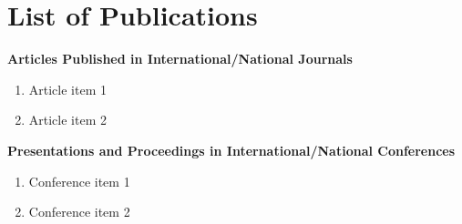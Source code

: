 
\chapter{List of Publications} %

\label{LOP} %


\textbf{Articles Published in International/National Journals}

\begin{enumerate}
    \item Article item 1

    \item Article item 2
\end{enumerate}

\textbf{Presentations and Proceedings in International/National Conferences}

\begin{enumerate}
    \item Conference item 1

    \item Conference item 2
\end{enumerate}